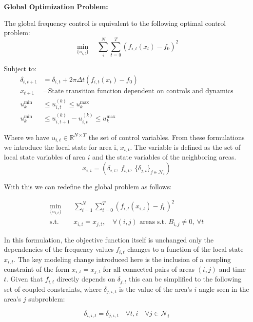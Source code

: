 \documentclass{article}
\begin{document}
\textbf{Global Optimization Problem:}

The global frequency control is equivalent to the following optimal control problem:
\begin{equation}
\min_{\{u_{i,t}\}} \quad \sum_i^N \sum_{t=0}^{T} \left( f_{i,t}(x_t) - f_0 \right)^2
\end{equation}

Subject to:
\begin{align}
    \delta_{i,t+1} &= \delta_{i,t} + 2\pi \Delta t (f_{i,t}(x_t) - f_0) \\
    x_{t+1} &= \text{State transition function dependent on controls and dynamics} \\
    u^{\min}_k &\leq u_{i,t}^{(k)} \leq u^{\max}_k \\
    u^{\min}_k &\leq u_{i,t+1}^{(k)} - u_{i,t}^{(k)} \leq u^{\max}_k
\end{align}

Where we have $u_{i,t} \in \mathbb{R}^{N \times T}$ the set of control variables. From these formulations we introduce the local state for area i, $x_{i,t}$. The variable is defined as the set of local state variables of area $i$ and the state variables of the neighboring areas.
\[
x_{i,t} = \left( \delta_{i,t},\ f_{i,t},\ \{ \delta_{j,t} \}_{j \in \mathcal{N}_i} \right)
\] 

With this we can redefine the global problem as follows:

\begin{align}
\min_{\{u_{i,t}\}} \quad & \sum_{i=1}^{N} \sum_{t=0}^{T} \left( f_{i,t}(x_{i,t}) - f_0 \right)^2 \label{eq:decentralized_obj} \\
\text{s.t.} \quad & x_{i,t} = x_{j,t}, \quad \forall (i,j) \text{ areas s.t. } B_{i,j} \neq 0,\ \forall t \label{eq:coupling_constraint}
\end{align}

In this formulation, the objective function itself is unchanged only the dependencies of the frequency values $f_{i,t}$ changes to a function of the local state $x_{i,t}$. The key modeling change introduced here is the inclusion of a coupling constraint of the form $x_{i,t} = x_{j,t}$ for all connected pairs of areas $(i,j)$ and time $t$. Given that $f_{i,t}$ directly depends on $\delta_{j,t}$ this can be simplified to the following set of coupled constraints, where $\delta_{j, i, t}$ is the value of the area's $i$ angle seen in the area's $j$ subproblem:

\begin{equation}
    \delta_{i, i, t} = \delta_{j, i, t} \quad \forall t, i \quad \forall j \in \mathcal{N}_i
\end{equation}
\end{document}
